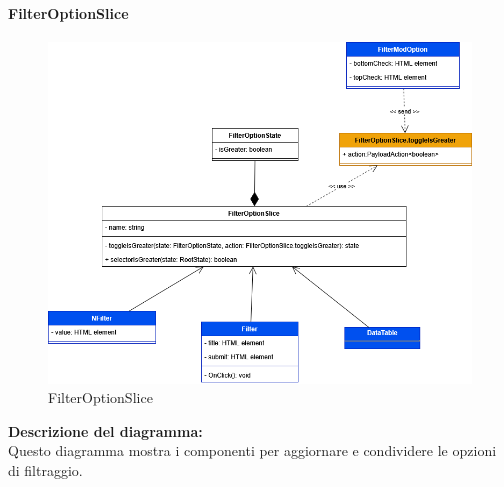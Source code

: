\pagebreak

\paragraph{FilterOptionSlice}
\begin{figure}[h!] \centering
    \includegraphics[scale=0.35]{template/images/uml_front/logic/filteroptionslice.png}
    \caption{FilterOptionSlice}
\end{figure}
\textbf{Descrizione del diagramma:}\\
Questo diagramma mostra i componenti per aggiornare e condividere le opzioni di filtraggio.
